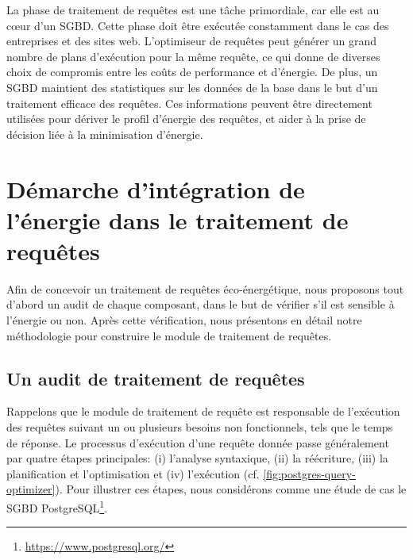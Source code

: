 La phase de traitement de requêtes est une tâche primordiale, car elle est au cœur d'un SGBD. Cette phase doit être exécutée constamment dans le cas des entreprises et des sites web. L'optimiseur de requêtes peut générer un grand nombre de plans d'exécution pour la même requête, ce qui donne de diverses choix de compromis entre les coûts de performance et d'énergie. De plus, un SGBD maintient des statistiques sur les données de la base dans le but d'un traitement efficace des requêtes. Ces informations peuvent être directement utilisées pour dériver le profil d'énergie des requêtes, et aider à la prise de décision liée à la minimisation d'énergie.

\section{Démarche d'intégration de l'énergie dans le traitement de requêtes}\label{Demarche}
Afin de concevoir un traitement de requêtes éco-énergétique, nous proposons tout d'abord un audit de chaque composant, dans le but de vérifier s'il est sensible à l'énergie ou non. Après cette vérification, nous présentons en détail notre méthodologie pour construire le module de traitement de requêtes.

\subsection{Un audit de traitement de requêtes}
Rappelons que le module de traitement de requête est responsable de l'exécution des requêtes suivant un ou plusieurs besoins non fonctionnels, tels que le temps de réponse. Le processus d'exécution d'une requête donnée passe généralement par quatre étapes principales: (i) l'analyse syntaxique, (ii) la réécriture, (iii) la planification et l'optimisation et (iv) l'exécution (cf. \ref{fig:postgres-query-optimizer}). Pour illustrer ces étapes, nous considérons comme une étude de cas le SGBD PostgreSQL\footnote{\url{https://www.postgresql.org/}}.

